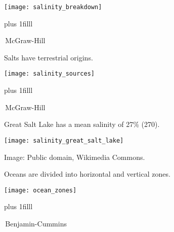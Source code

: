\documentclass[t,handout]{beamer}  %
\begin{document}


\begin{frame}[t]%
	\begin{center}
	\texttt{[image: salinity\_breakdown]}
	\end{center}

\vskip0pt plus 1filll

\tiny \textcopyright\,McGraw-Hill
\end{frame}


\begin{frame}[t]{Salts have terrestrial origins.}
	\begin{center}
	\texttt{[image: salinity\_sources]}
	\end{center}

\vskip0pt plus 1filll

\tiny \textcopyright\,McGraw-Hill
\end{frame}

\begin{frame}[t]{Great Salt Lake has a mean salinity of 27\% (270\text{\textperthousand}).}
	\begin{center}
		\texttt{[image: salinity\_great\_salt\_lake]}
	\end{center}

	\tiny Image: Public domain, Wikimedia Commons.
\end{frame}

\begin{frame}[t]{Oceans are divided into horizontal and vertical zones.}
	\begin{center}
	\texttt{[image: ocean\_zones]}
	\end{center}

\vskip0pt plus 1filll

\tiny \textcopyright\,Benjamin-Cummins
\end{frame}
\end{document}
